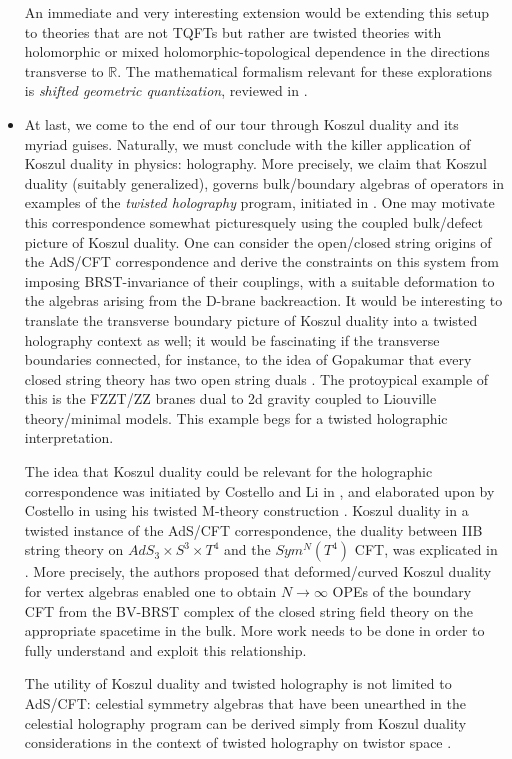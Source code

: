 \documentclass[11pt]{amsart}
\begin{document}
\begin{itemize}
An immediate and very interesting extension would be extending this setup to theories that are not TQFTs but rather are twisted theories with holomorphic or mixed holomorphic-topological dependence in the directions transverse to $\mathbb{R}$. The mathematical formalism relevant for these explorations is \textit{shifted geometric quantization}, reviewed in \cite{Safronov}. \\



\item At last, we come to the end of our tour through Koszul duality and its myriad guises. Naturally, we must conclude with the killer application of Koszul duality in physics: holography. More precisely, we claim that Koszul duality (suitably generalized), governs bulk/boundary algebras of operators in examples of the \textit{twisted holography} program, initiated in \cite{CG}. One may motivate this correspondence somewhat picturesquely using the coupled bulk/defect picture of Koszul duality. One can consider the open/closed string origins of the AdS/CFT correspondence and derive the constraints on this system from imposing BRST-invariance of their couplings, with a suitable deformation to the algebras arising from the D-brane backreaction. It would be interesting to translate the transverse boundary picture of Koszul duality into a twisted holography context as well; it would be fascinating if the transverse boundaries connected, for instance, to the idea of Gopakumar that every closed string theory has two open string duals \cite{Gopakumar}. The protoypical example of this is the FZZT/ZZ branes dual to 2d gravity coupled to Liouville theory/minimal models. This example begs for a twisted holographic interpretation. 

The idea that Koszul duality could be relevant for the holographic correspondence was initiated by Costello and Li in \cite{TwistedSugra}, and elaborated upon by Costello in \cite{CostelloM2} using his twisted M-theory construction \cite{CostelloMtheory}. Koszul duality in a twisted instance of the AdS/CFT correspondence, the duality between IIB string theory on $AdS_3 \times S^3 \times T^4$ and the $Sym^N(T^4)$ CFT, was explicated in \cite{CP}. More precisely, the authors proposed that deformed/curved Koszul duality for vertex algebras enabled one to obtain $N \rightarrow \infty$ OPEs of the boundary CFT from the BV-BRST complex of the closed string field theory on the appropriate spacetime in the bulk. More work needs to be done in order to fully understand and exploit this relationship. 

The utility of Koszul duality and twisted holography is not limited to AdS/CFT: celestial symmetry algebras that have been unearthed in the celestial holography program can be derived simply from Koszul duality considerations in the context of twisted holography on twistor space \cite{CP2}. 
\end{itemize}
\end{document}
